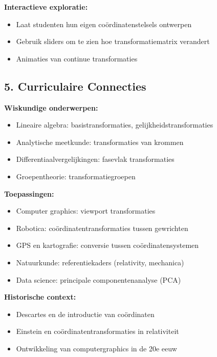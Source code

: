 \documentclass{ximera}
\begin{document}
\textbf{Interactieve exploratie:}
\begin{itemize}
\item Laat studenten hun eigen coördinatenstelsels ontwerpen
\item Gebruik sliders om te zien hoe transformatiematrix verandert
\item Animaties van continue transformaties
\end{itemize}

\subsection*{5. Curriculaire Connecties}

\textbf{Wiskundige onderwerpen:}
\begin{itemize}
\item Lineaire algebra: basistransformaties, gelijkheidstransformaties
\item Analytische meetkunde: transformaties van krommen
\item Differentiaalvergelijkingen: fasevlak transformaties
\item Groepentheorie: transformatiegroepen
\end{itemize}

\textbf{Toepassingen:}
\begin{itemize}
\item Computer graphics: viewport transformaties
\item Robotica: coördinatentransformaties tussen gewrichten
\item GPS en kartografie: conversie tussen coördinatensystemen
\item Natuurkunde: referentiekaders (relativity, mechanica)
\item Data science: principale componentenanalyse (PCA)
\end{itemize}

\textbf{Historische context:}
\begin{itemize}
\item Descartes en de introductie van coördinaten
\item Einstein en coördinatentransformaties in relativiteit
\item Ontwikkeling van computergraphics in de 20e eeuw
\end{itemize}
\end{document}
